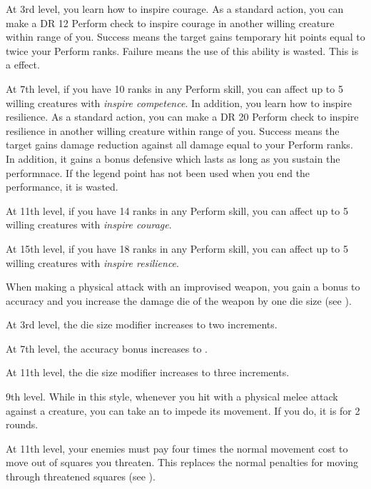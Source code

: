     At 3rd level, you learn how to inspire courage.
     As a standard action, you can make a DR 12 Perform check to inspire courage in another willing creature within \rngmed range of you.
    Success means the target gains temporary hit points equal to twice your Perform ranks.
    Failure means the use of this ability is wasted.
    This is a  effect.

    At 7th level, if you have 10 ranks in any Perform skill, you can affect up to 5 willing creatures with \textit{inspire competence}.
    In addition, you learn how to inspire resilience.
     As a standard action, you can make a DR 20 Perform check to inspire resilience in another willing creature within \rngmed range of you.
    Success means the target gains damage reduction against all damage equal to your Perform ranks.
    In addition, it gains a bonus defensive  which lasts as long as you sustain the performnace.
    If the legend point has not been used when you end the performance, it is wasted.

    At 11th level, if you have 14 ranks in any Perform skill, you can affect up to 5 willing creatures with \textit{inspire courage}.

    At 15th level, if you have 18 ranks in any Perform skill, you can affect up to 5 willing creatures with \textit{inspire resilience}.

    \featben When making a physical attack with an improvised weapon, you gain a  bonus to accuracy and you increase the damage die of the weapon by one die size (see ).

    At 3rd level, the die size modifier increases to two increments.

    At 7th level, the accuracy bonus increases to .

    At 11th level, the die size modifier increases to three increments.

    \featpre 9th level.
    \featben While in this style, whenever you hit with a physical melee attack against a creature, you can take an  to impede its movement.
    If you do, it is \immobilized for 2 rounds.

    At 11th level, your enemies must pay four times the normal movement cost to move out of squares you threaten.
    This replaces the normal penalties for moving through threatened squares (see ).

